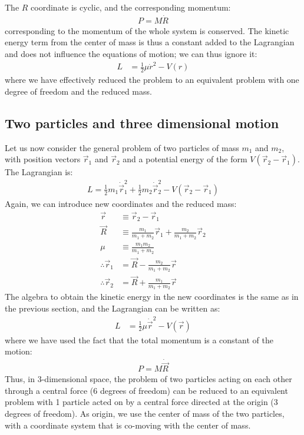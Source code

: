 The $R$ coordinate is cyclic, and the corresponding momentum:
\begin{align}
P=M\dot{R}
\end{align}
corresponding to the momentum of the whole system is conserved. The kinetic energy term from the center of mass is thus a constant added to the Lagrangian and does not influence the equations of motion; we can thus ignore it:
\begin{align}
L&=\frac{1}{2}\mu\dot{r}^2-V(r)\nonumber
\end{align}
where we have effectively reduced the problem to an equivalent problem with one degree of freedom and the reduced mass.

\subsection{Two particles and three dimensional motion}
Let us now consider the general problem of two particles of mass $m_1$ and $m_2$, with position vectors $\vec{r}_1$ and $\vec{r}_2$ and a potential energy of the form $V(\vec{r}_2-\vec{r}_1)$. The Lagrangian is:
\begin{align}
L=\frac{1}{2}m_1\dot{\vec{r}}_1^2+\frac{1}{2}m_2\dot{\vec{r}}_2^2-V(\vec{r}_2-\vec{r}_1)
\end{align}
Again, we can introduce new coordinates and the reduced mass:
\begin{align*}
\vec{r}&\equiv \vec{r}_2-\vec{r}_1\nonumber\\
\vec{R}&\equiv \frac{m_1}{m_1+m_2}\vec{r}_1+\frac{m_2}{m_1+m_2}\vec{r}_2\nonumber\\
\mu&\equiv \frac{m_1m_2}{m_1+m_2}\nonumber\\
\therefore \vec{r}_1&=\vec{R}-\frac{m_2}{m_1+m_2}\vec{r}\nonumber\\
\therefore \vec{r}_2&=\vec{R}+\frac{m_1}{m_1+m_2}\vec{r}\nonumber
\end{align*}
The algebra to obtain the kinetic energy in the new coordinates is the same as in the previous section, and the Lagrangian can be written as:
\begin{align}
L&=\frac{1}{2}\mu\dot{\vec{r}}^2-V(\vec{r})\nonumber
\end{align}
where we have used the fact that the total momentum is a constant of the motion:
\begin{align}
P=M\dot{\vec{R}}
\end{align}
Thus, in 3-dimensional space, the problem of two particles acting on each other through a central force (6 degrees of freedom) can be reduced to an equivalent problem with 1 particle acted on by a  central force directed at the origin (3 degrees of freedom). As origin, we use the center of mass of the two particles, with a coordinate system that is co-moving with the center of mass.


